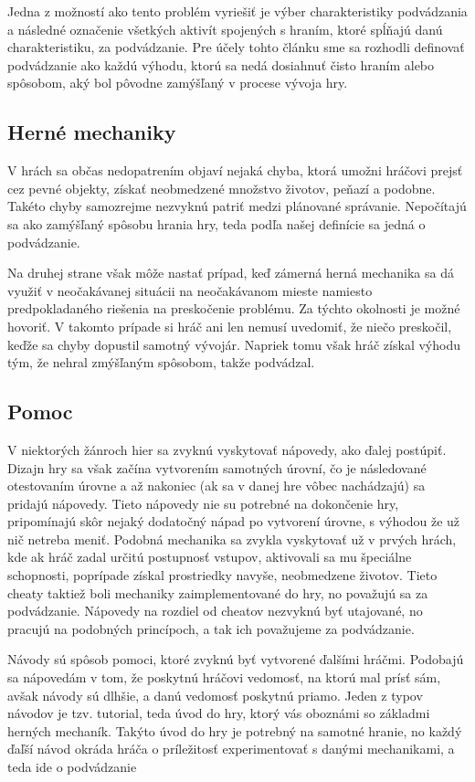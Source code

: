 \documentclass[10pt, oneside, slovak,a4paper]{article}
\begin{document}
Jedna z možností ako tento problém vyriešiť je výber charakteristiky podvádzania a následné označenie všetkých aktivít spojených s hraním, ktoré spĺňajú danú charakteristiku, za podvádzanie. Pre účely tohto článku sme sa rozhodli definovať podvádzanie ako každú výhodu, ktorú sa nedá dosiahnuť čisto hraním alebo spôsobom, aký bol pôvodne zamýšľaný v procese vývoja hry.

\subsection{Herné mechaniky}
V hrách sa občas nedopatrením objaví nejaká chyba, ktorá umožni hráčovi prejsť cez pevné objekty, získať neobmedzené množstvo životov, peňazí a podobne. Takéto chyby samozrejme nezvyknú patriť medzi plánované správanie. Nepočítajú sa ako zamýšľaný spôsobu hrania hry, teda podľa našej definície sa jedná o podvádzanie.

Na druhej strane však môže nastať prípad, keď zámerná herná mechanika sa dá využiť v neočakávanej situácii na neočakávanom mieste namiesto predpokladaného riešenia na preskočenie problému. Za týchto okolnosti je možné hovoriť. V takomto prípade si hráč ani len nemusí uvedomiť, že niečo preskočil, keďže sa chyby dopustil samotný vývojár. Napriek tomu však hráč získal výhodu tým, že nehral zmýšľaným spôsobom, takže podvádzal.

\subsection{Pomoc}
V niektorých žánroch hier sa zvyknú vyskytovať nápovedy, ako ďalej postúpiť. Dizajn hry sa však začína vytvorením samotných úrovní, čo je následované otestovaním úrovne a až nakoniec  (ak sa v danej hre vôbec nachádzajú) sa pridajú nápovedy. Tieto nápovedy nie su potrebné na dokončenie hry, pripomínajú skôr nejaký dodatočný nápad po vytvorení úrovne, s výhodou že už nič netreba meniť. Podobná mechanika sa zvykla vyskytovať už v prvých hrách, kde ak hráč zadal určitú postupnosť vstupov, aktivovali sa mu špeciálne schopnosti, poprípade získal prostriedky navyše, neobmedzene životov. Tieto cheaty taktiež boli mechaniky zaimplementované do hry, no považujú sa za podvádzanie. Nápovedy na rozdiel od cheatov nezvyknú byť utajované, no pracujú na podobných princípoch, a tak ich považujeme za podvádzanie.

Návody sú spôsob pomoci, ktoré zvyknú byť vytvorené ďalšími hráčmi. Podobajú sa nápovedám v tom, že poskytnú hráčovi vedomosť, na ktorú mal prísť sám, avšak návody sú dlhšie, a danú vedomosť poskytnú priamo. Jeden z typov návodov je tzv. tutorial, teda úvod do hry, ktorý vás oboznámi so základmi herných mechaník. Takýto úvod do hry je potrebný na samotné hranie, no každý ďaľší návod okráda hráča o príležitosť experimentovať s danými mechanikami, a teda ide o podvádzanie
\end{document}
